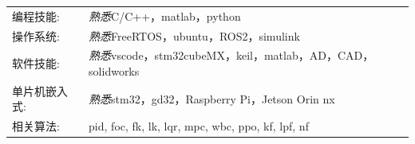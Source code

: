 
\begin{tabular}{ll} 
	\textsc{编程技能:}   & \emph{熟悉}C/C++，matlab，python\\
	\textsc{操作系统:}   & \emph{熟悉}FreeRTOS，ubuntu，ROS2，simulink\\
	\textsc{软件技能:}   & \emph{熟悉}vscode，stm32cubeMX，keil，matlab，AD，CAD，solidworks\\
	\textsc{单片机嵌入式:}   & \emph{熟悉}stm32，gd32，Raspberry Pi，Jetson Orin nx \\
	\textsc{相关算法:}   & pid, foc, fk, lk, lqr, mpc, wbc, ppo, kf, lpf, nf \\
\end{tabular}

